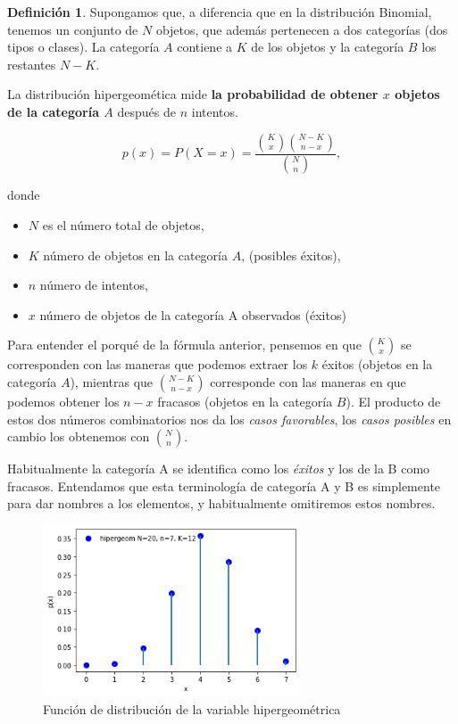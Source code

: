 \documentclass[]{book}
\providecommand{\tightlist}{%
  \setlength{\itemsep}{0pt}\setlength{\parskip}{0pt}}
\theoremstyle{plain}
\theoremstyle{definition}
\newtheorem{definition}[theorem]{Definición}
\theoremstyle{definition} %
\begin{document}
\begin{definition}
  Supongamos que, a diferencia que en la distribución Binomial, tenemos un
conjunto de \(N\) objetos, que además pertenecen a dos categorías (dos
tipos o clases). La categoría \(A\) contiene a \(K\) de los objetos y la
categoría \(B\) los restantes \(N-K\).

La distribución hipergeomética mide \textbf{la probabilidad de obtener
\(x\) objetos de la categoría \(A\)} después de \(n\) intentos.

\[\displaystyle p(x)=P(X=x)={\frac {{\binom {K}{x}}{\binom {N-K}{n-x}}}{\binom {N}{n}}},\]

donde

\begin{itemize}
\tightlist
\item
  \(N\) es el número total de objetos,
\item
  \(K\) número de objetos en la categoría \(A\), (posibles éxitos),
\item
  \(n\) número de intentos,
\item
  \(x\) número de objetos de la categoría A observados (éxitos)
\end{itemize}

Para entender el porqué de la fórmula anterior, pensemos en que
\({\binom {K}{x}}\) se corresponden con las maneras que podemos extraer
los \(k\) éxitos (objetos en la categoría \(A\)), mientras que
\({\binom {N-K}{n-x}}\) corresponde con las maneras en que podemos
obtener los \(n-x\) fracasos (objetos en la categoría \(B\)). El
producto de estos dos números combinatorios nos da los \emph{casos
favorables}, los \emph{casos posibles} en cambio los obtenemos con
\({\binom {N}{n}}\).

Habitualmente la categoría A se identifica como los \emph{éxitos} y los de la B como fracasos. 
Entendamos que esta terminología de categoría A y B es simplemente para dar nombres a los elementos, y habitualmente omitiremos 
estos nombres.

\end{definition}

\begin{figure}
  \centering
  \includegraphics[width=3in,height=\textheight]{img/hipergeom.png}
  \caption{Función de distribución de la variable hipergeométrica}
\end{figure}
\end{document}
